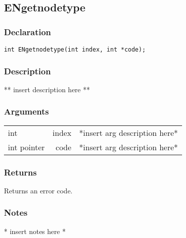 \subsection{ENgetnodetype}
\subsubsection{Declaration}
\begin{lstlisting}
int ENgetnodetype(int index, int *code);
\end{lstlisting}
\subsubsection{Description}
** insert description here **
\subsubsection{Arguments}
\begin{tabular}{l r p{11cm} }
int&index&*insert arg description here* \\[6pt]
int pointer&code&*insert arg description here* \\[6pt]
\end{tabular}
\subsubsection{Returns}
Returns an error code.
\subsubsection{Notes}
* insert notes here *